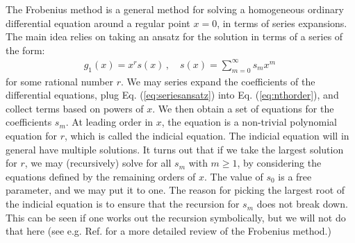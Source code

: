 \documentclass{article}
\begin{document}
The Frobenius method is a general method for solving a homogeneous ordinary differential equation around a regular point $x = 0$, in terms of series expansions. The main idea relies on taking an ansatz for the solution in terms of a series of the form:
\begin{align}
    \label{eq:seriesansatz}
    g_1(x) = x^r s(x)\,,\quad s(x) = \sum_{m=0}^\infty s_{m} x^m\,
\end{align}
for some rational number $r$. We may series expand the coefficients of the differential equations, plug Eq. (\ref{eq:seriesansatz}) into Eq. (\ref{eq:nthorder}), and collect terms based on powers of $x$. We then obtain a set of equations for the coefficients $s_{m}$. At leading order in $x$, the equation is a non-trivial polynomial equation for $r$, which is called the indicial equation. The indicial equation will in general have multiple solutions. It turns out that if we take the largest solution for $r$, we may (recursively) solve for all $s_m$ with $m\geq 1$, by considering the equations defined by the remaining orders of $x$. The value of $s_0$ is a free parameter, and we may put it to one. The reason for picking the largest root of the indicial equation is to ensure that the recursion for $s_m$ does not break down. This can be seen if one works out the recursion symbolically, but we will not do that here (see e.g. Ref. \cite{Coddington} for a more detailed review of the Frobenius method.)
\end{document}
